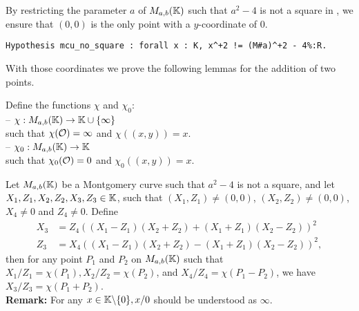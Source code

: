 By restricting the parameter $a$ of $M_{a,b}(\mathbb{K})$ such that $a^2-4$ is not a
square in \K, we ensure that $(0,0)$ is the only point with a $y$-coordinate of $0$.
\begin{lstlisting}[language=Coq]
Hypothesis mcu_no_square : forall x : K, x^+2 != (M#a)^+2 - 4%:R.
\end{lstlisting}

With those coordinates we prove the following lemmas for the addition of two points.
\begin{definition}Define the functions $\chi$ and $\chi_0$:\\
-- $\chi : M_{a,b}(\mathbb{K}) \to \mathbb{K} \cup \{\infty\}$\\
  such that $\chi(\mathcal{O}) = \infty$ and $\chi((x,y)) = x$.\\
-- $\chi_0 : M_{a,b}(\mathbb{K}) \to \mathbb{K}$\\
  such that $\chi_0(\mathcal{O}) = 0$ and $\chi_0((x,y)) = x$.
\end{definition}
\begin{lemma}
\label{lemma-add}
Let $M_{a,b}(\mathbb{K})$ be a Montgomery curve such that $a^2-4$ is not a square, and
let $X_1, Z_1, X_2, Z_2, X_3, Z_3 \in \mathbb{K}$, such that $(X_1,Z_1) \neq (0,0)$, $(X_2,Z_2) \neq (0,0)$, $X_4 \neq 0$ and $Z_4 \neq 0$.
Define
\begin{align*}
X_3 &= Z_4((X_1 - Z_1)(X_2+Z_2) + (X_1+Z_1)(X_2-Z_2))^2\\
Z_3 &= X_4((X_1 - Z_1)(X_2+Z_2) - (X_1+Z_1)(X_2-Z_2))^2,
\end{align*}
then for any point $P_1$ and $P_2$ on $M_{a,b}(\mathbb{K})$ such that $X_1/Z_1 = \chi(P_1), X_2/Z_2 = \chi(P_2)$, and $X_4/Z_4 = \chi(P_1 - P_2)$, we have $X_3/Z_3 = \chi(P_1+P_2)$.\\
\textbf{Remark:} For any $x \in \mathbb{K} \backslash\{0\}, x/0$ should be understood as $\infty$.
\end{lemma}
%
%

